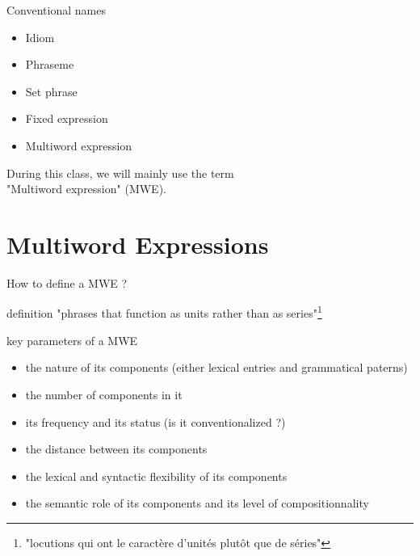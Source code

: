 \documentclass[serif, aspectratio=169]{beamer}
\begin{document}
\begin{frame}{Conventional names}
    \begin{block}{}
        \begin{itemize}
            \item Idiom
            \item Phraseme
            \item Set phrase
            \item Fixed expression
            \item Multiword expression
        \end{itemize}
    \end{block}
    \vfill
    \pause
    \begin{center}
        \Large
        During this class, we will mainly use the term \\ "Multiword expression" (MWE).
    \end{center}
\end{frame}

\section{Multiword Expressions}

\begin{frame}{How to define a MWE ?}
    \pause
    \begin{block}{\citet{bally_traite_1909} definition} %
        "phrases that function as units rather than as series"\footnote{"locutions qui ont le caractère d'unités plutôt que de séries"}
    \end{block}
    \vfill
    \pause
    \begin{block}{\citet{granger_phraseology_2008} key parameters of a MWE}
        \begin{itemize}
            \pause
            \item the nature of its components (either lexical entries and grammatical paterns)
            \pause
            \item the number of components in it
            \pause
            \item its frequency and its status (is it conventionalized ?)
            \pause
            \item the distance between its components
            \pause
            \item the lexical and syntactic flexibility of its components
            \pause
            \item the semantic role of its components and its level of compositionnality
        \end{itemize}
    \end{block}
\end{frame}
\end{document}
